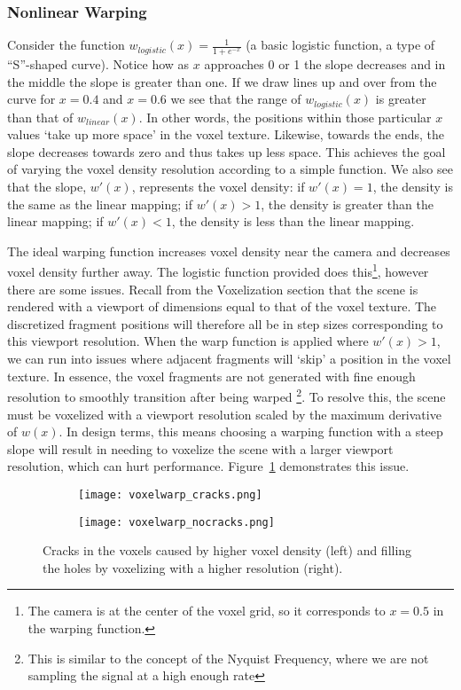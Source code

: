 \subsubsection{Nonlinear Warping}
Consider the function $w_{logistic}(x) = \frac{1}{1 + e^{-x}}$ (a basic logistic function, a type of ``S''-shaped curve). Notice how as $x$ approaches 0 or 1 the slope decreases and in the middle the slope is greater than one. If we draw lines up and over from the curve for $x = 0.4$ and $x = 0.6$ we see that the range of $w_{logistic}(x)$ is greater than that of $w_{linear}(x)$. In other words, the positions within those particular $x$ values `take up more space' in the voxel texture. Likewise, towards the ends, the slope decreases towards zero and thus takes up less space. This achieves the goal of varying the voxel density resolution according to a simple function. We also see that the slope, $w'(x)$, represents the voxel density: if $w'(x) = 1$, the density is the same as the linear mapping; if $w'(x) > 1$, the density is greater than the linear mapping; if $w'(x) < 1$, the density is less than the linear mapping.

The ideal warping function increases voxel density near the camera and decreases voxel density further away. The logistic function provided does this\footnote{The camera is at the center of the voxel grid, so it corresponds to $x = 0.5$ in the warping function.}, however there are some issues. Recall from the Voxelization section that the scene is rendered with a viewport of dimensions equal to that of the voxel texture. The discretized fragment positions will therefore all be in step sizes corresponding to this viewport resolution. When the warp function is applied where $w'(x) > 1$, we can run into issues where adjacent fragments will `skip' a position in the voxel texture. In essence, the voxel fragments are not generated with fine enough resolution to smoothly transition after being warped \footnote{This is similar to the concept of the Nyquist Frequency, where we are not sampling the signal at a high enough rate}. To resolve this, the scene must be voxelized with a viewport resolution scaled by the maximum derivative of $w(x)$. In design terms, this means choosing a warping function with a steep slope will result in needing to voxelize the scene with a larger viewport resolution, which can hurt performance. Figure~\ref{fig:voxelcracks} demonstrates this issue.

\begin{figure}[h!]
    \centering
    \begin{subfigure}[t]{\textwidth}
        \texttt{[image: voxelwarp\_cracks.png]}
    \end{subfigure}
    \begin{subfigure}[t]{\textwidth}
        \texttt{[image: voxelwarp\_nocracks.png]}
    \end{subfigure}
    \caption{Cracks in the voxels caused by higher voxel density (left) and filling the holes by voxelizing with a higher resolution (right).}
    \label{fig:voxelcracks}
\end{figure}

